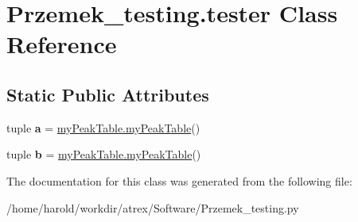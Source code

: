 \hypertarget{classPrzemek__testing_1_1tester}{\section{Przemek\-\_\-testing.\-tester Class Reference}
\label{classPrzemek__testing_1_1tester}
}
\subsection*{Static Public Attributes}
\begin{DoxyCompactItemize}
\item 
\hypertarget{classPrzemek__testing_1_1tester_a3b224f5c318c0a6ff10f84f3ed1ae172}{tuple {\bfseries a} = \hyperlink{classmyPeakTable_1_1myPeakTable}{my\-Peak\-Table.\-my\-Peak\-Table}()}\label{classPrzemek__testing_1_1tester_a3b224f5c318c0a6ff10f84f3ed1ae172}

\item 
\hypertarget{classPrzemek__testing_1_1tester_a567760c83534060e622ca5c14ba7d393}{tuple {\bfseries b} = \hyperlink{classmyPeakTable_1_1myPeakTable}{my\-Peak\-Table.\-my\-Peak\-Table}()}\label{classPrzemek__testing_1_1tester_a567760c83534060e622ca5c14ba7d393}

\end{DoxyCompactItemize}


The documentation for this class was generated from the following file\-:\begin{DoxyCompactItemize}
\item 
/home/harold/workdir/atrex/\-Software/Przemek\-\_\-testing.\-py\end{DoxyCompactItemize}
